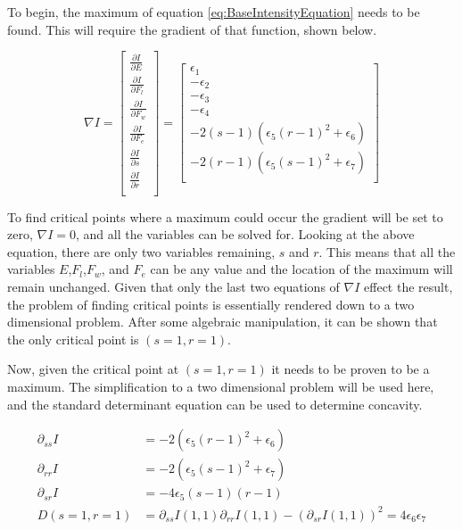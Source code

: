 To begin, the maximum of equation \ref{eq:BaseIntensityEquation} needs to be found. This will require the gradient of that function, shown below.

\begin{equation*}
	\nabla I =
	\left[
	\begin{matrix}
		\frac{\partial I}{\partial E} \\
		\frac{\partial I}{\partial F_l} \\
		\frac{\partial I}{\partial F_w} \\
		\frac{\partial I}{\partial F_e} \\ 
		\frac{\partial I}{\partial s} \\
		\frac{\partial I}{\partial r} \\
	\end{matrix}
	\right] =
	\left[
	\begin{matrix}
		\epsilon_1 \\
		-\epsilon_2 \\
		-\epsilon_3 \\
		-\epsilon_4 \\
		-2(s-1)\left( \epsilon_5(r-1)^2+\epsilon_6 \right) \\
		-2(r-1)\left( \epsilon_5(s-1)^2+\epsilon_7 \right) \\
	\end{matrix}
	\right]
\end{equation*}

To find critical points where a maximum could occur the gradient will be set to zero, $\nabla I=0$, and all the variables can be solved for. Looking at the above equation, there are only two variables remaining, $s$ and $r$. This means that all the variables $E$,$F_l$,$F_w$, and $F_e$ can be any value and the location of the maximum will remain unchanged. Given that only the last two equations of $\nabla I$ effect the result, the problem of finding critical points is essentially rendered down to a two dimensional problem. After some algebraic manipulation, it can be shown that the only critical point is $(s=1,r=1)$.

Now, given the critical point at $(s=1,r=1)$ it needs to be proven to be a maximum. The simplification to a two dimensional problem will be used here, and the standard determinant equation can be used to determine concavity.

\begin{equation*}
	\begin{split}
		\partial_{ss}I & = -2\left( 
			\epsilon_5(r-1)^2+\epsilon_6 
		\right) \\
		\partial_{rr}I & = -2\left( 
			\epsilon_5(s-1)^2+\epsilon_7 
		\right) \\
		\partial_{sr}I & = -4 \epsilon_5 (s-1)(r-1) \\
		D(s=1,r=1) & = \partial_{ss}I(1,1) \partial_{rr}I(1,1)-\left(
			\partial_{sr} I(1,1)
		\right)^2 = 4\epsilon_6 \epsilon_7
	\end{split}
\end{equation*}

